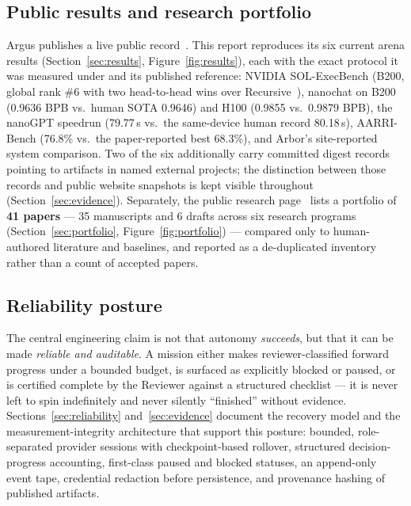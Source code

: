 \subsection{Public results and research portfolio}

Argus publishes a live public record~\cite{argus_results}. This report
reproduces its six current arena results
(Section~\ref{sec:results}, Figure~\ref{fig:results}), each with the exact
protocol it was measured under and its published reference: NVIDIA
SOL-ExecBench (B200, global rank \#6 with two head-to-head wins over
Recursive~\cite{recursive2026firststeps}), nanochat on B200 (0.9636 BPB vs.\
human SOTA 0.9646) and H100 (0.9855 vs.\ 0.9879 BPB), the nanoGPT speedrun
(79.77\,s vs.\ the same-device human record 80.18\,s), AARRI-Bench (76.8\% vs.\
the paper-reported best 68.3\%), and Arbor's site-reported system comparison.
Two of the six additionally carry committed digest records pointing to artifacts
in named external projects; the distinction between those records and public
website snapshots is kept visible throughout (Section~\ref{sec:evidence}).
Separately, the public research
page~\cite{argus_research} lists a portfolio of \textbf{41 papers} ---
35 manuscripts and 6 drafts across six research programs
(Section~\ref{sec:portfolio}, Figure~\ref{fig:portfolio}) --- compared only to
human-authored literature and baselines, and reported as a de-duplicated
inventory rather than a count of accepted papers.

\subsection{Reliability posture}

The central engineering claim is not that autonomy \emph{succeeds}, but that it
can be made \emph{reliable and auditable}. A mission either makes
reviewer-classified forward progress under a bounded budget, is surfaced as
explicitly blocked or paused, or is certified complete by the Reviewer against a
structured checklist --- it is never left to spin indefinitely and never silently
``finished'' without evidence. Sections~\ref{sec:reliability}
and~\ref{sec:evidence} document the recovery model and the measurement-integrity
architecture that support this posture: bounded, role-separated provider sessions
with checkpoint-based rollover, structured decision-progress accounting, first-class paused
and blocked statuses, an append-only event tape, credential redaction before
persistence, and provenance hashing of published artifacts.

